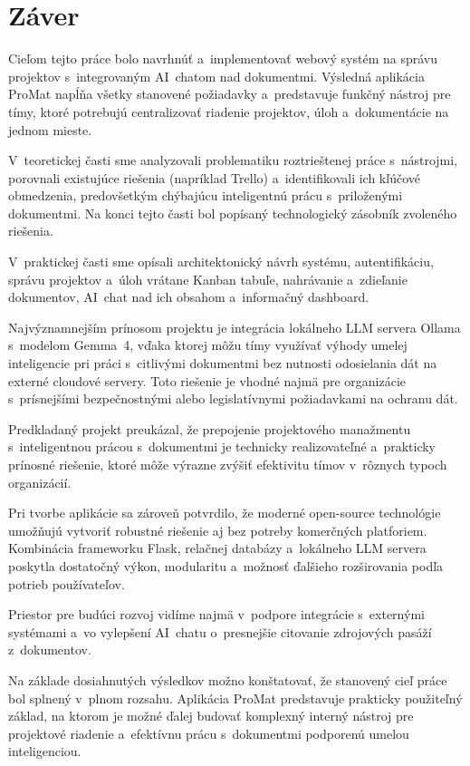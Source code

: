 \chapter*{Záver}

        Cieľom tejto práce bolo navrhnúť a~implementovať webový systém na správu
projektov s~integrovaným AI~chatom nad dokumentmi. Výsledná aplikácia ProMat napĺňa
všetky stanovené požiadavky a~predstavuje funkčný nástroj pre tímy, ktoré potrebujú
centralizovať riadenie projektov, úloh a~dokumentácie na jednom mieste.

        V~teoretickej časti sme analyzovali problematiku roztrieštenej práce s~nástrojmi,
porovnali existujúce riešenia (napríklad Trello) a~identifikovali ich kľúčové
obmedzenia, predovšetkým chýbajúcu inteligentnú prácu s~priloženými dokumentmi.
Na konci tejto časti bol popísaný technologický zásobník zvoleného riešenia.

        V~praktickej časti sme opísali architektonický návrh systému, 
autentifikáciu, správu projektov a~úloh vrátane Kanban tabuľe,
nahrávanie a~zdieľanie dokumentov, AI~chat nad ich obsahom a~informačný dashboard.

        Najvýznamnejším prínosom projektu je integrácia lokálneho LLM servera Ollama
s~modelom Gemma~4, vďaka ktorej môžu tímy využívať výhody umelej inteligencie pri
práci s~citlivými dokumentmi bez nutnosti odosielania dát na externé cloudové servery.
Toto riešenie je vhodné najmä pre organizácie s~prísnejšími bezpečnostnými alebo
legislatívnymi požiadavkami na ochranu dát.

        Predkladaný projekt preukázal, že prepojenie projektového manažmentu
s~inteligentnou prácou s~dokumentmi je technicky realizovateľné a~prakticky
prínosné riešenie, ktoré môže výrazne zvýšiť efektivitu tímov v~rôznych typoch
organizácií.

        Pri tvorbe aplikácie sa zároveň potvrdilo, že moderné open-source technológie
umožňujú vytvoriť robustné riešenie aj bez potreby komerčných platforiem. Kombinácia
frameworku Flask, relačnej databázy a~lokálneho LLM servera poskytla dostatočný výkon,
modularitu a~možnosť ďalšieho rozširovania podľa potrieb používateľov.

        Priestor pre budúci rozvoj vidíme najmä v~podpore integrácie s~externými systémami a~vo
vylepšení AI~chatu o~presnejšie citovanie zdrojových pasáží z~dokumentov.

        Na základe dosiahnutých výsledkov možno konštatovať, že stanovený cieľ práce bol
splnený v~plnom rozsahu. Aplikácia ProMat predstavuje prakticky použiteľný základ,
na ktorom je možné ďalej budovať komplexný interný nástroj pre projektové riadenie
a~efektívnu prácu s~dokumentmi podporenú umelou inteligenciou.